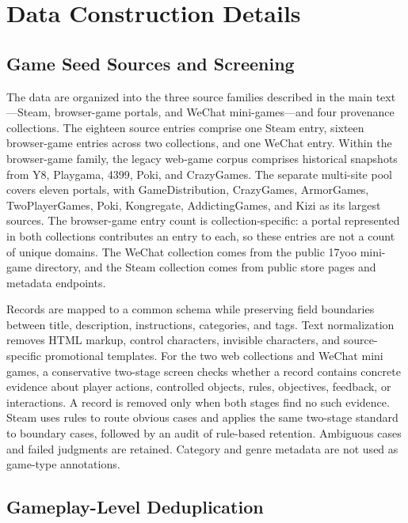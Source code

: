 \documentclass{article}
\begin{document}
\section{Data Construction Details}
\label{app:data_construction}

\subsection{Game Seed Sources and Screening}

The data are organized into the three source families described in the main text---Steam, browser-game portals, and WeChat mini-games---and four provenance collections. The eighteen source entries comprise one Steam entry, sixteen browser-game entries across two collections, and one WeChat entry. Within the browser-game family, the legacy web-game corpus comprises historical snapshots from Y8, Playgama, 4399, Poki, and CrazyGames. The separate multi-site pool covers eleven portals, with GameDistribution, CrazyGames, ArmorGames, TwoPlayerGames, Poki, Kongregate, AddictingGames, and Kizi as its largest sources. The browser-game entry count is collection-specific: a portal represented in both collections contributes an entry to each, so these entries are not a count of unique domains. The WeChat collection comes from the public 17yoo mini-game directory, and the Steam collection comes from public store pages and metadata endpoints.

Records are mapped to a common schema while preserving field boundaries between title, description, instructions, categories, and tags. Text normalization removes HTML markup, control characters, invisible characters, and source-specific promotional templates. For the two web collections and WeChat mini games, a conservative two-stage screen checks whether a record contains concrete evidence about player actions, controlled objects, rules, objectives, feedback, or interactions. A record is removed only when both stages find no such evidence. Steam uses rules to route obvious cases and applies the same two-stage standard to boundary cases, followed by an audit of rule-based retention. Ambiguous cases and failed judgments are retained. Category and genre metadata are not used as game-type annotations.

\subsection{Gameplay-Level Deduplication}
\label{app:gameplay_dedup}
\end{document}
